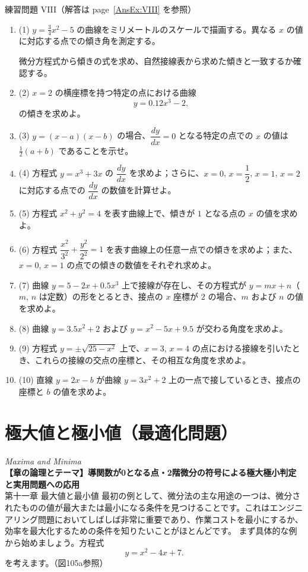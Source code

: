 \documentclass[a4paper,11pt,openany]{ltjsbook}
\newcommand{\Pageref}[2][p.]{#1~\ref{#2}}
\begin{document}
練習問題 VIII（解答は \Pageref[page]{AnsEx:VIII} を参照）

\begin{enumerate}
\item (1) $y = \frac{3}{4} x^2 - 5$ の曲線をミリメートルのスケールで描画する。異なる $x$ の値に対応する点での傾き角を測定する。

微分方程式から傾きの式を求め、自然接線表から求めた傾きと一致するか確認する。
\item (2) $x = 2$ の横座標を持つ特定の点における曲線
\[
y = 0.12x^3 - 2,
\]
の傾きを求めよ。
\item (3) $y = (x - a)(x - b)$ の場合、$\dfrac{dy}{dx} = 0$ となる特定の点での $x$ の値は $\tfrac{1}{2}(a + b)$ であることを示せ。

\item(4) 方程式 \( y = x^3 + 3x \) の \(\dfrac{dy}{dx}\) を求めよ；さらに、\( x = 0 \), \( x = \dfrac{1}{2} \), \( x = 1 \), \( x = 2 \) に対応する点での \(\dfrac{dy}{dx}\) の数値を計算せよ。

\item(5) 方程式 \( x^2 + y^2 = 4 \) を表す曲線上で、傾きが \( 1 \) となる点の \( x \) の値を求めよ。

\item(6) 方程式 \(\dfrac{x^2}{3^2} + \dfrac{y^2}{2^2} = 1\) を表す曲線上の任意一点での傾きを求めよ；また、\( x = 0 \), \( x = 1 \) の点での傾きの数値をそれぞれ求めよ。

\item(7) 曲線 \( y = 5 - 2x + 0.5x^3 \) 上で接線が存在し、その方程式が \( y = mx + n \)（\( m \), \( n \) は定数）の形をとるとき、接点の \( x \) 座標が \( 2 \) の場合、\( m \) および \( n \) の値を求めよ。

\item(8) 曲線 \( y = 3.5x^2 + 2 \) および \( y = x^2 - 5x + 9.5 \) が交わる角度を求めよ。

\item(9) 方程式 \( y = ± \sqrt{25-x^2} \) 上で、\( x = 3 \), \( x = 4 \) の点における接線を引いたとき、これらの接線の交点の座標と、その相互な角度を求めよ。

\item(10) 直線 \( y = 2x - b \) が曲線 \( y = 3x^2 + 2 \) 上の一点で接しているとき、接点の座標と \( b \) の値を求めよ。
\end{enumerate}



\chapter{極大値と極小値（最適化問題）}
\noindent\textit{\large Maxima and Minima}\\[2mm]
\noindent\textbf{\small 【章の論理とテーマ】導関数が0となる点・2階微分の符号による極大極小判定と実用問題への応用}\\[4mm]
第十一章 最大値と最小値
最初の例として、微分法の主な用途の一つは、微分されたものの値が最大または最小になる条件を見つけることです。これはエンジニアリング問題においてしばしば非常に重要であり、作業コストを最小にするか、効率を最大化するための条件を知りたいことがほとんどです。
まず具体的な例から始めましょう。方程式
\[
y = x^2 - 4x + 7.
\]
を考えます。（図105a参照）
\end{document}

